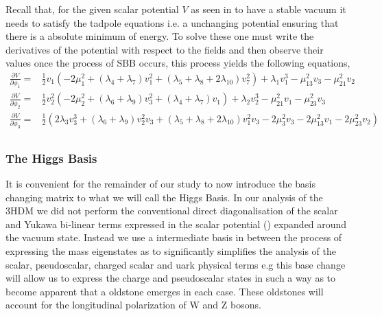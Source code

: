 Recall that, for the given scalar potential $V$ as seen in  to have a stable vacuum it needs to satisfy the tadpole equations i.e. a unchanging potential ensuring that there is a absolute minimum of energy. 
%
To solve these one must write the derivatives of the potential with respect to the fields and then observe their values once the process of SBB occurs, this process yields the following equations,
%
\begin{equation}
\label{eq:3HDM_tadpoles}
\begin{split}
\frac{\partial V}{\partial \phi_1} = & \frac{1}{2} v_1 \left(-2 \mu _1^2+\left(\lambda _4+\lambda _7\right) v_1^2+\left(\lambda _5+\lambda _8+2 \lambda _{10}\right) v_7^2\right)+\lambda _1 v_1^3-\mu _{13}^2 v_3-\mu _{21}^2 v_2 \\ 
\frac{\partial V}{\partial \phi_2} = & \frac{1}{2} v_2^2 \left(-2 \mu _2^2+\left(\lambda _6+\lambda _9\right) v_3^2+\left(\lambda _4+\lambda _7\right) v_1\right)+\lambda _2 v_2^3-\mu _{21}^2 v_1-\mu _{23}^2 v_3 \\
\frac{\partial V}{\partial \phi_3} = & \frac{1}{2} \left(2 \lambda _3 v_3^3+\left(\lambda _6+\lambda _9\right) v_2^2 v_3+\left(\lambda _5+\lambda _8+2 \lambda _{10}\right) v_1^2 v_3-2 \mu _3^2 v_3-2 \mu _{13}^2 v_1-2 \mu _{23}^2 v_2\right) \\
\end{split} 
\end{equation}

\subsubsection{The Higgs Basis}

It is convenient for the remainder of our study to now introduce the basis changing matrix to what we will call the Higgs Basis.
%
In our analysis of the 3HDM we did not perform the conventional direct diagonalisation of the scalar and Yukawa bi-linear terms expressed in the scalar potential () expanded around the vacuum state.
%
Instead we use a intermediate basis in between the process of expressing the mass eigenstates as to significantly simplifies the analysis of the scalar, pseudoscalar, charged scalar and uark physical terms 
%
%
e.g this base change will allow us to express the charge and pseudoscalar states in such a way as to become apparent that a oldstone emerges in each case. 
%
These oldstones will account for the longitudinal polarization of W and Z bosons. 

